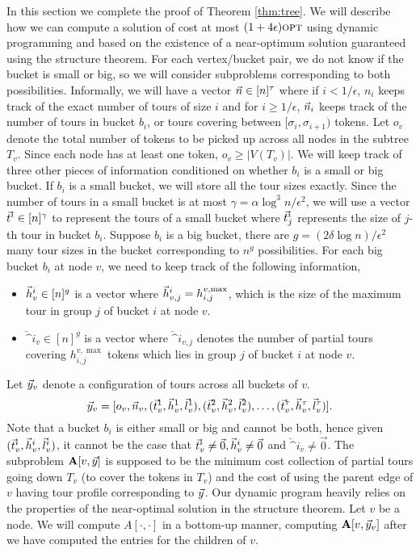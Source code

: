 \documentclass[twoside,leqno]{article}
\newcommand{\opt}{\mbox{\sc opt}}
\newcommand{\eps}{\epsilon}
\begin{document}
In this section we complete the proof of Theorem \ref{thm:tree}. We will describe how we can compute a solution of cost at most $(1 + 4\eps)\opt$ using dynamic programming and based on the existence of a near-optimum solution guaranteed using the structure theorem.
For each vertex/bucket pair, we do not know if the bucket is small or big, so we will consider subproblems corresponding to both possibilities. Informally, we will have a vector $\vec{n} \in [n]^{\tau}$ where if $i < 1/\eps$, $n_i$ keeps track of the exact number of tours of size $i$ and for $i \ge 1/\eps$, $\vec{n}_i$ keeps track of the number of tours in bucket $b_i$, or tours covering between $[\sigma_i, \sigma_{i+1})$ tokens. Let $o_v$ denote the total number of tokens to be picked up across all nodes in the subtree $T_v$. Since each node has at least one token, $o_v \ge |V(T_v)|$. We will keep track of three other pieces of information conditioned on whether $b_i$ is a small or big bucket. If $b_i$ is a small bucket, we will store all the tour sizes exactly. Since the number of tours in a small bucket is at most $\gamma = \alpha \log^3n /\eps^2$, we will use a vector $\vec{t}^i \in [n]^\gamma$ to represent the tours of a small bucket where $\vec{t}^i_j$ represents the size of $j$-th tour in bucket $b_i$. Suppose $b_i$ is a big bucket, there are $g = (2\delta \log n)/\eps^2 $ many tour sizes in the bucket corresponding to $n^g$ possibilities. For each big bucket $b_i$ at node $v$, we need to keep track of the following information, 
\begin{itemize}
    \item $\vec{h}^i_v \in [n]^g$ is a vector where $\vec{h}^i_{v,j} = h^{v, \max}_{i,j}$, which is the size of the maximum tour in group $j$ of bucket $i$ at node $v$. 
    \item $\lvec^i_v \in [n]^g$ is a vector where $\lvec^i_{v,j}$ denotes the number of partial tours covering $h^{v, \max}_{i,j}$ tokens which lies in group $j$ of bucket $i$ at node $v$. 
\end{itemize}
Let $\vec{y}_v$ denote a configuration of tours across all buckets of $v$. 
$$\vec{y}_v = [o_v, \vec{n}_v, (\vec{t}_v^1, \vec{h}_v^1, \vec{l}_v^1), (\vec{t}_v^2, \vec{h}_v^2, \vec{l}_v^2), \ldots, (\vec{t}_v^\tau, \vec{h}_v^\tau, \vec{l}_v^\tau)].$$
Note that a bucket $b_i$ is either small or big and cannot be both, hence given $(\vec{t}^i_v, \vec{h}^i_v, \vec{l}^i_v)$, it cannot be the case that $\vec{t}^i_v \neq \vec{0}, \vec{h}^i_v \neq \vec{0}$ and $\lvec^i_v \neq \vec{0}$. 
The subproblem $\textbf{A}[v, \vec{y}]$ is supposed to be the minimum cost collection of partial tours going down $T_v$ (to cover the tokens in $T_v$) and the cost of using the parent edge of $v$ having tour profile corresponding to $\vec{y}$. Our dynamic program heavily relies on the properties of the near-optimal solution in the structure theorem.  Let $v$ be a node. We will compute $A[\cdot, \cdot]$ in a bottom-up manner, computing $\textbf{A}[v, \vec{y}_v]$ after we have computed the entries for the children of $v$. 
\end{document}
